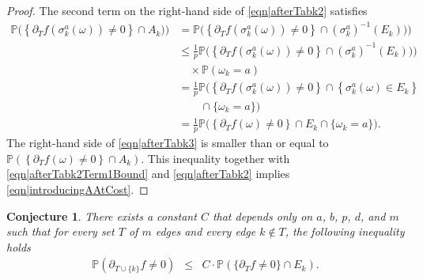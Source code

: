 \documentclass[reqno]{amsart}
\newtheorem{conjecture}[theorem]{Conjecture}
\begin{document}
\begin{proof}
The second term on the right-hand side of \eqref{eqn|afterTabk2} satisfies
\begin{align}
\mathbb P\Big(\left\{\partial_Tf\left(\sigma_k^a(\omega)\right)\neq 0\right\} \cap A_k\Big)\Big)&=
\mathbb P\Big(\left\{\partial_Tf\left(\sigma_k^a(\omega)\right)\neq 0\right\} \cap (\sigma_k^a)^{-1}(E_k)\Big)\Big)\nonumber \\
&\leq \frac1p
\mathbb P\Big(\left\{\partial_Tf\left(\sigma_k^a(\omega)\right)\neq 0\right\} \cap (\sigma_k^a)^{-1}(E_k)\Big)\Big) \nonumber \\
&\quad \times \mathbb P(\omega_k=a)\nonumber \\
&=\frac1p
\mathbb P\Big(\left\{\partial_Tf\left(\sigma_k^a(\omega)\right)\neq 0\right\} \cap \left\{\sigma_k^a(\omega)\in E_k\right\} \nonumber \\
&\quad\quad \cap \{\omega_k=a\}\Big)  \nonumber \\
&=
\frac1p
\mathbb P\Big(\left\{\partial_Tf(\omega )\neq 0\right\} \cap E_k  \cap \{\omega_k=a\}\Big) .
\label{eqn|afterTabk3} 
\end{align}
The right-hand side of \eqref{eqn|afterTabk3}  is smaller than or equal to $\mathbb P\left(\left\{\partial_Tf(\omega)\neq 0\right\}\cap A_k\right)$. This inequality together with \eqref{eqn|afterTabk2Term1Bound} and 
\eqref{eqn|afterTabk2} implies 
\eqref{eqn|introducingAAtCost}. 
 \end{proof} 
 
 
 \begin{conjecture}\label{conj|introducingEAtCost}
There exists a constant $C$ that depends only on $a$, $b$, $p$, $d$, and $m$ such that for every 
 set $T$ of $m$ edges and every edge $k\not \in T$, the following inequality holds
 \begin{eqnarray}
 \mathbb P\left(\partial_{T\cup \{k\}}f\neq 0\right)&\leq& C\cdot \mathbb P\left(\{\partial_Tf\neq 0\}\cap E_k\right). \label{eqn|introducingEAtCost}
 \end{eqnarray}
 \end{conjecture}
 
\end{document}
